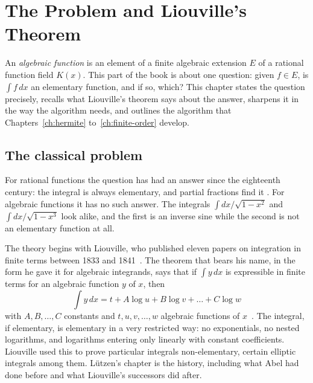 \chapter{The Problem and Liouville's Theorem}\label{ch:liouville}

An \emph{algebraic function} is an element of a finite algebraic extension
$E$ of a rational function field $K(x)$. This part of the book is about one
question: given $f \in E$, is $\int f\,dx$ an elementary function, and if so,
which? This chapter states the question precisely, recalls what Liouville's
theorem says about the answer, sharpens it in the way the algorithm needs,
and outlines the algorithm that Chapters~\ref{ch:hermite}
to~\ref{ch:finite-order} develop.

\section{The classical problem}\label{sec:liouville-history}

For rational functions the question has had an answer since the eighteenth
century: the integral is always elementary, and partial fractions find it
. For algebraic functions it has no such answer. The integrals
$\int dx/\sqrt{1 - x^2}$ and $\int dx/\sqrt{1 - x^3}$ look alike, and the
first is an inverse sine while the second is not an elementary function at
all.

The theory begins with Liouville, who published eleven papers on integration
in finite terms between 1833 and 1841~\cite[Chapter~IX]{lutzen1990}. The
theorem that bears his name, in the form he gave it for algebraic integrands,
says that if $\int y\,dx$ is expressible in finite terms for an algebraic
function $y$ of $x$, then
\[
  \int y\,dx = t + A \log u + B \log v + \dots + C \log w
\]
with $A, B, \dots, C$ constants and $t, u, v, \dots, w$ algebraic functions of
$x$~\cite[p.~352]{lutzen1990}. The integral, if elementary, is elementary in a
very restricted way: no exponentials, no nested logarithms, and logarithms
entering only linearly with constant coefficients. Liouville used this to
prove particular integrals non-elementary, certain elliptic integrals among
them. L\"utzen's chapter is the history, including what Abel had done before
and what Liouville's successors did after.


